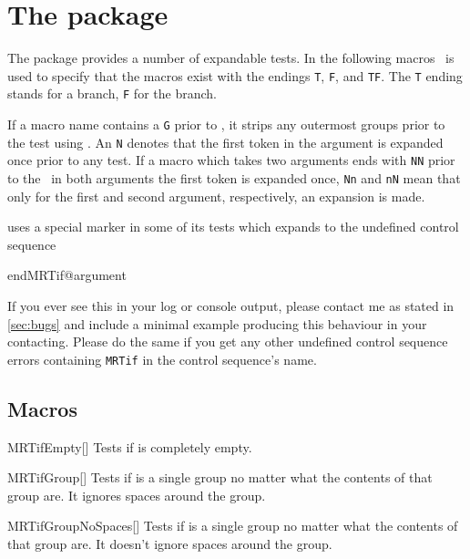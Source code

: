 \chapter{The  package}
The  package provides a number of expandable tests. In the following
macros \tfarg\ is used to specify that the macros exist with the endings
\texttt{T}, \texttt{F}, and \texttt{TF}. The \texttt{T} ending stands for a
 branch, \texttt{F} for the  branch.

If a macro name contains a \texttt{G} prior to \tfarg, it strips any outermost
groups prior to the test using . An \texttt{N} denotes that the
first token in the argument is expanded once prior to any test. If a macro which
takes two arguments ends with \texttt{NN} prior to the \tfarg\ in both arguments
the first token is expanded once, \texttt{Nn} and \texttt{nN} mean that only for
the first and second argument, respectively, an expansion is made.

 uses a special marker in some of its tests which expands to the
undefined control sequence
\begin{center}
  \ttfamily
  \detokenize\expandafter\expandafter\expandafter
    {\csname endMRTif@argument\endcsname}%
\end{center}
If you ever see this in your log or console output, please contact me as stated
in \autoref{sec:bugs} and include a minimal example producing this behaviour in
your contacting. Please do the same if you get any other undefined control
sequence errors containing \texttt{MRTif} in the control sequence's name.

\section{Macros}
\begin{describemacroTF}[G,N,GN]{MRTifEmpty}[]
  Tests if  is completely empty.
\end{describemacroTF}

\begin{describemacroTF}[N]{MRTifGroup}[]
  Tests if  is a single group no matter what the contents of that
  group are. It ignores spaces around the group.
\end{describemacroTF}

\begin{describemacroTF}[N]{MRTifGroupNoSpaces}[]
  Tests if  is a single group no matter what the contents of that
  group are. It doesn't ignore spaces around the group.
\end{describemacroTF}

